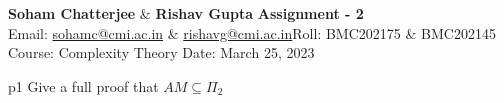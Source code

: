 \documentclass[a4paper, 11pt]{article}
\begin{document}
	
	
\textsf{\noindent \large\textbf{Soham Chatterjee} \& \textbf{Rishav Gupta} \hfill \textbf{Assignment - 2}\\
    Email: \href{sohamc@cmi.ac.in}{sohamc@cmi.ac.in} \& \href{rishavg@cmi.ac.in}{rishavg@cmi.ac.in}\hfill Roll: BMC202175 \& BMC202145\\
		\normalsize Course: Complexity Theory \hfill Date: March 25, 2023}
	
	
	\begin{problem}{%
		}{p1%
		}
		Give a full proof that $AM\subseteq \Pi_2$		
	\end{problem}
	
\end{document}
